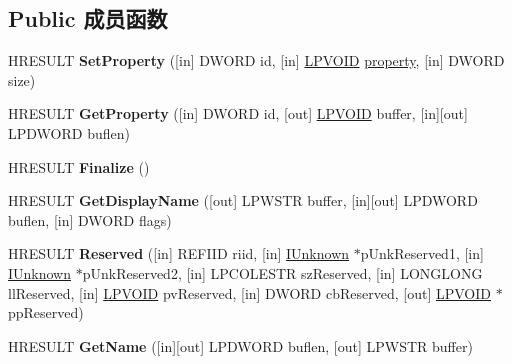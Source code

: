 \subsection*{Public 成员函数}
\begin{DoxyCompactItemize}
\item 
\mbox{\label{interfaceunique_aeec1241d2b1c17195ec8c128a232393a}} 
H\+R\+E\+S\+U\+LT {\bfseries Set\+Property} (\mbox{[}in\mbox{]} D\+W\+O\+RD id, \mbox{[}in\mbox{]} \hyperlink{interfacevoid}{L\+P\+V\+O\+ID} \hyperlink{structproperty}{property}, \mbox{[}in\mbox{]} D\+W\+O\+RD size)
\item 
\mbox{\label{interfaceunique_a46688d46a4e43adba5e2ebd6a7c130b6}} 
H\+R\+E\+S\+U\+LT {\bfseries Get\+Property} (\mbox{[}in\mbox{]} D\+W\+O\+RD id, \mbox{[}out\mbox{]} \hyperlink{interfacevoid}{L\+P\+V\+O\+ID} buffer, \mbox{[}in\mbox{]}\mbox{[}out\mbox{]} L\+P\+D\+W\+O\+RD buflen)
\item 
\mbox{\label{interfaceunique_aeb3259792ac8406208b30ed2e6cf9bfb}} 
H\+R\+E\+S\+U\+LT {\bfseries Finalize} ()
\item 
\mbox{\label{interfaceunique_a08b561ee4cdfb28baa2b8c4241205df8}} 
H\+R\+E\+S\+U\+LT {\bfseries Get\+Display\+Name} (\mbox{[}out\mbox{]} L\+P\+W\+S\+TR buffer, \mbox{[}in\mbox{]}\mbox{[}out\mbox{]} L\+P\+D\+W\+O\+RD buflen, \mbox{[}in\mbox{]} D\+W\+O\+RD flags)
\item 
\mbox{\label{interfaceunique_ae8d936c54dca25ec5ce42b54f38c0fa4}} 
H\+R\+E\+S\+U\+LT {\bfseries Reserved} (\mbox{[}in\mbox{]} R\+E\+F\+I\+ID riid, \mbox{[}in\mbox{]} \hyperlink{interface_i_unknown}{I\+Unknown} $\ast$p\+Unk\+Reserved1, \mbox{[}in\mbox{]} \hyperlink{interface_i_unknown}{I\+Unknown} $\ast$p\+Unk\+Reserved2, \mbox{[}in\mbox{]} L\+P\+C\+O\+L\+E\+S\+TR sz\+Reserved, \mbox{[}in\mbox{]} L\+O\+N\+G\+L\+O\+NG ll\+Reserved, \mbox{[}in\mbox{]} \hyperlink{interfacevoid}{L\+P\+V\+O\+ID} pv\+Reserved, \mbox{[}in\mbox{]} D\+W\+O\+RD cb\+Reserved, \mbox{[}out\mbox{]} \hyperlink{interfacevoid}{L\+P\+V\+O\+ID} $\ast$pp\+Reserved)
\item 
\mbox{\label{interfaceunique_a73c7d232517f51a7ab4018f92be87fd8}} 
H\+R\+E\+S\+U\+LT {\bfseries Get\+Name} (\mbox{[}in\mbox{]}\mbox{[}out\mbox{]} L\+P\+D\+W\+O\+RD buflen, \mbox{[}out\mbox{]} L\+P\+W\+S\+TR buffer)

\end{DoxyCompactItemize}
